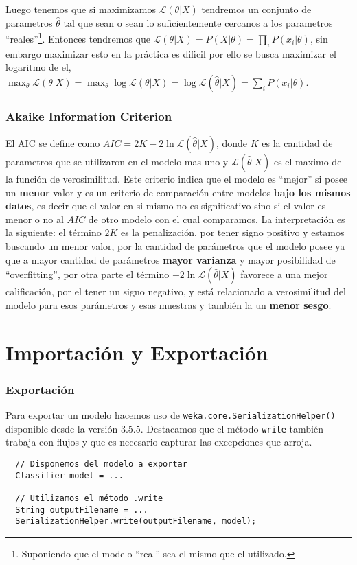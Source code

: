 \documentclass[10pt,a4paper]{article}
\begin{document}
Luego tenemos que si maximizamos $\mathcal{L}(\theta|X)$ tendremos un conjunto de parametros $\hat{\theta}$ tal que sean o sean lo suficientemente cercanos a los parametros ``reales''\footnote{Suponiendo que el modelo ``real'' sea el mismo que el utilizado.}. Entonces tendremos que $\mathcal{L}(\theta|X) = P(X|\theta) = \prod_i P(x_i|\theta)$, sin embargo maximizar esto en la práctica es dificil por ello se busca maximizar el logaritmo de el, $\max_\theta \mathcal{L}(\theta|X) = \max_\theta \log \mathcal{L}(\theta|X) = \log \mathcal{L}(\hat{\theta}|X)= \sum_i P(x_i|\theta)$.

\section{Akaike Information Criterion}\label{modelselection_aic}
El AIC se define como $AIC = 2K - 2\ln{\mathcal{L}(\hat{\theta}|X)}$, donde $K$ es la cantidad de parametros que se utilizaron en el modelo mas uno y $\mathcal{L}(\hat{\theta}|X)$ es el maximo de la función de verosimilitud. Este criterio indica que el modelo es ``mejor'' si posee un \textbf{menor} valor y es un criterio de comparación entre modelos \textbf{bajo los mismos datos}, es decir que el valor en si mismo no es significativo sino si el valor es menor o no al $AIC$ de otro modelo con el cual comparamos. La interpretación es la siguiente: el término $2K$ es la penalización, por tener signo positivo y estamos buscando un menor valor, por la cantidad de parámetros que el modelo posee ya que a mayor cantidad de parámetros \textbf{mayor varianza} y mayor posibilidad de ``overfitting'', por otra parte el término $-2 \ln{\mathcal{L}(\hat{\theta}|X)}$ favorece a una mejor calificación, por el tener un signo negativo, y está relacionado a verosimilitud del modelo para esos parámetros y esas muestras y también la un \textbf{menor sesgo}\cite{Hu07}.


\part{Importación y Exportación}
\section{Exportación}
Para exportar un modelo hacemos uso de \lstinline{weka.core.SerializationHelper()} disponible desde la versión 3.5.5. Destacamos que el método \lstinline{write} también trabaja con flujos y que es necesario capturar las excepciones que arroja.
\begin{lstlisting}
  // Disponemos del modelo a exportar
  Classifier model = ...
  
  // Utilizamos el método .write
  String outputFilename = ...
  SerializationHelper.write(outputFilename, model);
\end{lstlisting}
\end{document}
